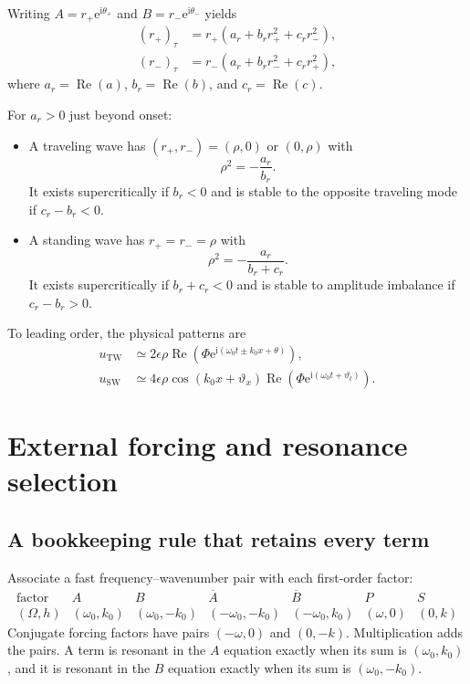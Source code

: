 \documentclass[11pt]{article}
\newcommand{\ii}{\mathrm{i}}
\newcommand{\ee}{\mathrm{e}}
\DeclareMathOperator{\RePart}{Re}
\begin{document}
Writing $A=r_+\ee^{\ii\theta_+}$ and
$B=r_-\ee^{\ii\theta_-}$ yields
\begin{subequations}
\begin{align}
  (r_+)_\tau&=r_+\left(a_r+b_r r_+^2+c_r r_-^2\right),\\
  (r_-)_\tau&=r_-\left(a_r+b_r r_-^2+c_r r_+^2\right),
\end{align}
\end{subequations}
where $a_r=\RePart(a)$, $b_r=\RePart(b)$, and $c_r=\RePart(c)$.

For $a_r>0$ just beyond onset:
\begin{itemize}
  \item A traveling wave has $(r_+,r_-)=(\rho,0)$ or $(0,\rho)$ with
  \begin{equation}
    \rho^2=-\frac{a_r}{b_r}.
  \end{equation}
  It exists supercritically if $b_r<0$ and is stable to the opposite traveling
  mode if $c_r-b_r<0$.

  \item A standing wave has $r_+=r_-=\rho$ with
  \begin{equation}
    \rho^2=-\frac{a_r}{b_r+c_r}.
  \end{equation}
  It exists supercritically if $b_r+c_r<0$ and is stable to amplitude
  imbalance if $c_r-b_r>0$.
\end{itemize}
To leading order, the physical patterns are
\begin{align}
  u_{\mathrm{TW}}&\simeq
  2\epsilon\rho\RePart\!\left(
  \Phi\ee^{\ii(\omega_0t\pm k_0x+\theta)}\right),\\
  u_{\mathrm{SW}}&\simeq
  4\epsilon\rho\cos(k_0x+\vartheta_x)
  \RePart\!\left(\Phi\ee^{\ii(\omega_0t+\vartheta_t)}\right).
\end{align}

\section{External forcing and resonance selection}
\label{sec:forcing}

\subsection{A bookkeeping rule that retains every term}

Associate a fast frequency--wavenumber pair with each first-order factor:
\begin{equation}
\begin{array}{c|cccccc}
\text{factor}&A& B&\overline A&\overline B&P&S\\ \hline
(\Omega,h)&(\omega_0,k_0)&(\omega_0,-k_0)&
(-\omega_0,-k_0)&(-\omega_0,k_0)&(\omega,0)&(0,k)
\end{array}
\label{eq:harmonic-table}
\end{equation}
Conjugate forcing factors have pairs $(-\omega,0)$ and $(0,-k)$.
Multiplication adds the pairs.  A term is resonant in the $A$ equation exactly
when its sum is $(\omega_0,k_0)$, and it is resonant in the $B$ equation
exactly when its sum is $(\omega_0,-k_0)$.
\end{document}
